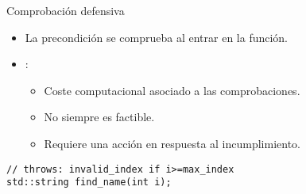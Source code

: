 \begin{frame}[t,fragile]{Comprobación defensiva}
\begin{itemize}
  \item La precondición se comprueba al entrar en la función.

  \item {}:
    \begin{itemize}
      \item Coste computacional asociado a las comprobaciones.
      \item No siempre es factible.
      \item Requiere una acción en respuesta al incumplimiento.
    \end{itemize}
\end{itemize}

\begin{lstlisting}
// throws: invalid_index if i>=max_index
std::string find_name(int i);
\end{lstlisting}
\end{frame}




